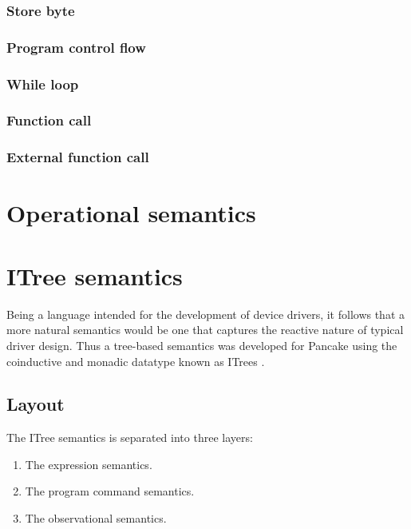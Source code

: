 \documentclass[graybox,envcountsect]{SVMonoEnhanced}
\begin{document}

\subsubsection{Store byte}
\label{sec:store-byte}

\subsubsection{Program control flow}
\label{sec:program-control-flow}

\subsubsection{While loop}
\label{sec:while-loop}

\subsubsection{Function call}
\label{sec:function-call}

\subsubsection{External function call}
\label{sec:external-call}

\newcommand{\sem}[1]{\llbracket #1 \rrbracket}

\section{Operational semantics}
\label{sec:oper-semant}

\section{ITree semantics}
\label{sec:itree-semantics}

Being a language intended for the development of device drivers, it follows that a more natural semantics would be one that captures the reactive nature of typical driver design. Thus a tree-based semantics was developed for Pancake using the coinductive and monadic datatype known as ITrees \cite{xia_executable_nodate}.

\subsection{Layout}
\label{sec:layout}

The ITree semantics is separated into three layers:
\begin{enumerate}
  \item The expression semantics.
  \item The program command semantics.
  \item The observational semantics.
\end{enumerate}
\end{document}
